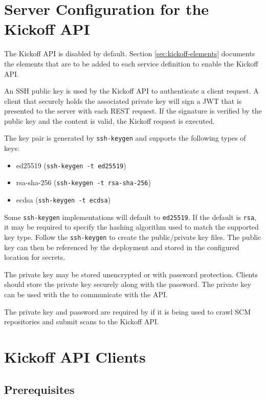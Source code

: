 \section{Server Configuration for the Kickoff API}\label{sec:kickoff-server-config}

The Kickoff API is disabled by default.  Section \ref{sec:kickoff-elements} documents the elements that
are to be added to each service definition to enable the Kickoff API.

An SSH public key is used by the Kickoff API to authenticate a client request.  A client that
securely holds the associated private key will sign a JWT that is presented to the server with each REST
request.  If the signature is verified by the public key and the content is valid, the Kickoff request is executed.

The key pair is generated by \texttt{ssh-keygen} and supports the following types of keys:

\begin{itemize}
  \item ed25519 (\texttt{ssh-keygen -t ed25519})
  \item rsa-sha-256 (\texttt{ssh-keygen -t rsa-sha-256})
  \item ecdsa (\texttt{ssh-keygen -t ecdsa})
\end{itemize}

Some \texttt{ssh-keygen} implementations will default to \texttt{ed25519}.  If the default is \texttt{rsa},
it may be required to specify the hashing algorithm used to match the supported key type.  Follow the
\texttt{ssh-keygen} to create the public/private key files.  The public key can then be referenced
by the \cxoneflow deployment and stored in the configured location for secrets.

The private key may be stored unencrypted or with password protection.  Clients should store the private key
securely along with the password.  The private key can be used with the 
to communicate with the API.

The private key and password are required by \cxoneflowaudit if it is being used to crawl SCM
repositories and submit scans to the Kickoff API.


\section{Kickoff API Clients}

\subsection{Prerequisites}

